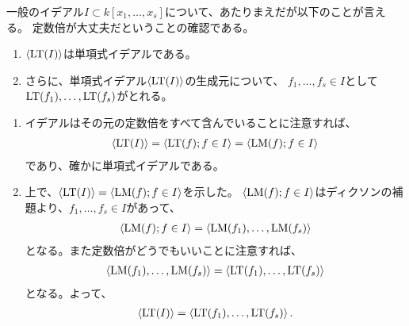 \documentclass[9pt]{ltjsarticle}
\begin{document}
一般のイデアル$I\subset k[x_1,\dots,x_s]$について、あたりまえだが以下のことが言える。
定数倍が大丈夫だということの確認である。
\begin{enumerate}
  \item $\left\langle {\rm LT}(I) \right\rangle$は単項式イデアルである。
  \item さらに、単項式イデアル$\left\langle {\rm LT}(I) \right\rangle$の生成元について、
  $f_1,\dots,f_s \in I$として${\rm LT}(f_1),\dots,{\rm LT}(f_s)$がとれる。
\end{enumerate}
\begin{myproof}
  \begin{enumerate}
    \item イデアルはその元の定数倍をすべて含んでいることに注意すれば、
    \begin{align}
      \left\langle {\rm LT}(I) \right\rangle = \left\langle {\rm LT}(f) ; f\in I \right\rangle = \left\langle {\rm LM}(f);f\in I \right\rangle
    \end{align}
    であり、確かに単項式イデアルである。
    \item 上で、$\left\langle {\rm LT}(I) \right\rangle = \left\langle {\rm LM}(f);f\in I \right\rangle$を示した。
    $\left\langle {\rm LM}(f);f\in I \right\rangle$はディクソンの補題より、$f_1,\dots,f_s \in I$があって、
    \begin{align}
      \left\langle {\rm LM}(f);f\in I \right\rangle = \left\langle {\rm LM}(f_1),\dots,{\rm LM}(f_s) \right\rangle
    \end{align}
    となる。また定数倍がどうでもいいことに注意すれば、
    \begin{align}
      \left\langle {\rm LM}(f_1),\dots,{\rm LM}(f_s) \right\rangle = \left\langle {\rm LT}(f_1),\dots,{\rm LT}(f_s) \right\rangle
    \end{align}
    となる。よって、
    \begin{align}
      \left\langle {\rm LT}(I) \right\rangle = \left\langle {\rm LT}(f_1),\dots,{\rm LT}(f_s) \right\rangle.
    \end{align}
  \end{enumerate}
\end{myproof}
\end{document}
